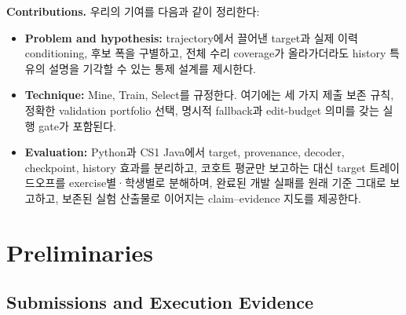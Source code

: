 \documentclass[10pt,conference]{IEEEtran}
\begin{document}
\noindent\textbf{Contributions.} 우리의 기여를 다음과 같이 정리한다:
\begin{itemize}
\item \textbf{Problem and hypothesis:} trajectory에서 끌어낸 target과 실제 이력 conditioning, 후보 폭을 구별하고, 전체 수리 coverage가 올라가더라도 history 특유의 설명을 기각할 수 있는 통제 설계를 제시한다.
\item \textbf{Technique:} Mine, Train, Select를 규정한다. 여기에는 세 가지 제출 보존 규칙, 정확한 validation portfolio 선택, 명시적 fallback과 edit-budget 의미를 갖는 실행 gate가 포함된다.
\item \textbf{Evaluation:} Python과 CS1 Java에서 target, provenance, decoder, checkpoint, history 효과를 분리하고, 코호트 평균만 보고하는 대신 target 트레이드오프를 exercise별·학생별로 분해하며, 완료된 개발 실패를 원래 기준 그대로 보고하고, 보존된 실험 산출물로 이어지는 claim--evidence 지도를 제공한다.
\end{itemize}

\section{Preliminaries}
\label{sec:preliminaries}
\subsection{Submissions and Execution Evidence}
\end{document}
